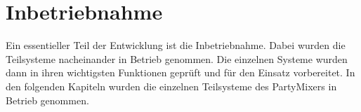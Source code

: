 \section{Inbetriebnahme}
\label{sec:Inbetriebnahme}

Ein essentieller Teil der Entwicklung ist die Inbetriebnahme. Dabei wurden die Teilsysteme nacheinander in Betrieb genommen. Die einzelnen Systeme wurden dann in ihren wichtigsten Funktionen geprüft und für den Einsatz vorbereitet. In den folgenden Kapiteln wurden die einzelnen Teilsysteme des PartyMixers in Betrieb genommen. 